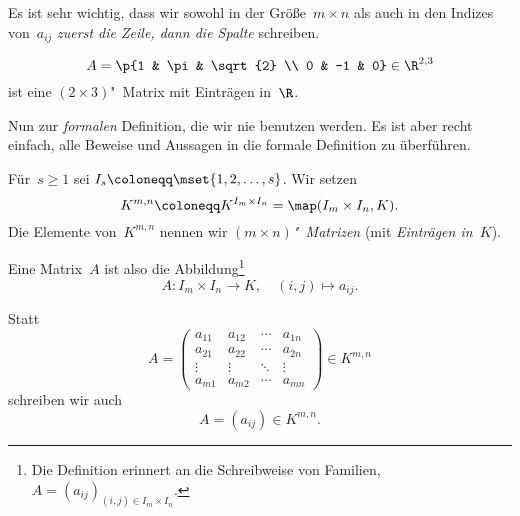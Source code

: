 \documentclass[a4paper]{article}
\begin{document}
\begin{remark}
    Es ist sehr wichtig, dass wir sowohl in der Größe~$m\times n$ als auch in den Indizes von~$a_{ij}$ \emph{zuerst die Zeile, dann die Spalte} schreiben.
\end{remark}

\begin{example}
    \begin{equation*}
        A = \p{1 & \pi & \sqrt{2} \\ 0 & -1 & 0} \in \R^{2, 3}
    \end{equation*}
    ist eine $(2\times 3)$"~Matrix mit Einträgen in~$\R$.
\end{example}

Nun zur \emph{formalen} Definition, die wir nie benutzen werden. Es ist aber recht einfach, alle Beweise und Aussagen in die formale Definition zu überführen.

\begin{definition}
    Für~$s \geq 1$ sei $I_s \coloneqq \mset{1, 2,\dots,s}$. Wir setzen
    \begin{equation*}
        K^{m,n} \coloneqq K^{I_m\times I_n} = \map(I_m\times I_n,K).
    \end{equation*}
    Die Elemente von~$K^{m,n}$ nennen wir \emph{$(m\times n)$"~Matrizen} (mit \emph{Einträgen in~$K$}).

    Eine Matrix~$A$ ist also die Abbildung\footnote{Die Definition erinnert an die Schreibweise von Familien, $A = (a_{ij})_{(i,j)\in I_m\times I_n}$.}
    \begin{equation*}
        A\colon I_m\times I_n \to K,\quad (i,j) \mapsto a_{ij}.
    \end{equation*}
\end{definition}

\begin{notation}
    Statt
    \begin{equation*}
        A =
        \begin{pmatrix}
            a_{11} & a_{12} & \cdots & a_{1n} \\
            a_{21} & a_{22} & \cdots & a_{2n} \\
            \vdots & \vdots & \ddots & \vdots \\
            a_{m1} & a_{m2} & \cdots & a_{mn}
        \end{pmatrix}
        \in K^{m,n}
    \end{equation*}
    schreiben wir auch
    \begin{equation*}
        A = (a_{ij}) \in K^{m,n}.
    \end{equation*}
\end{notation}
\end{document}
